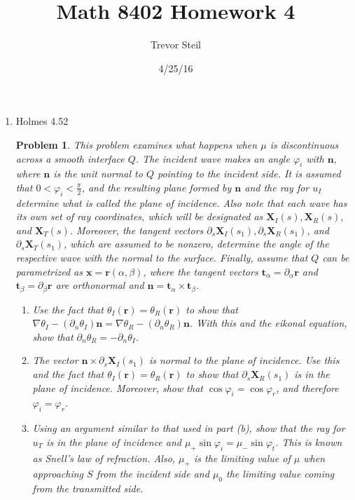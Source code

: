\documentclass[a4paper]{article}
\title{Math 8402 Homework 4 }
\date{4/25/16}
\author{Trevor Steil}
\newtheorem*{problem}{Problem}
\begin{document}
\maketitle
\begin{enumerate}
  \item Holmes 4.52
    \begin{problem}
      This problem examines what happens when $\mu$ is discontinuous across a smooth interface $Q$. The incident wave makes an angle $\varphi_i$ with
      $\mathbf{n}$, where $\mathbf{n}$ is the unit normal to $Q$ pointing to the incident side. It is assumed that $0 < \varphi_i <
      \frac{\pi}{2}$, and the resulting plane formed by $\mathbf{n}$ and the ray for $u_I$ determine what is called the plane of incidence. Also note
      that each wave has its own set of ray coordinates, which will be designated as $\mathbf{X}_I(s), \mathbf{X}_R(s),$ and $\mathbf{X}_T(s)$.
      Moreover, the tangent vectors $\partial_s \mathbf{X}_I(s_1), \partial_s \mathbf{X}_R(s_1)$, and $\partial_s \mathbf{X}_T(s_1)$, which are
      assumed to be nonzero, determine the angle of the respective wave with the normal to the surface. Finally, assume that $Q$ can be parametrized
      as $\mathbf{x} = \mathbf{r}(\alpha,\beta)$, where the tangent vectors $\mathbf{t}_\alpha = \partial_\alpha \mathbf{r}$ and $\mathbf{t}_\beta =
      \partial_\beta \mathbf{r}$ are orthonormal and $\mathbf{n} = \mathbf{t}_\alpha \times \mathbf{t}_\beta$.

      \begin{enumerate}
        \item Use the fact that $\theta_I(\mathbf{r}) = \theta_R(\mathbf{r})$ to show that $\nabla \theta_I - (\partial_n \theta_I) \mathbf{n} =
          \nabla \theta_R - (\partial_n \theta_R) \mathbf{n}$. With this and the eikonal equation, show that $\partial_n \theta_R = -\partial_n
          \theta_I$.

        \item The vector $\mathbf{n} \times \partial_s \mathbf{X}_I(s_1)$ is normal to the plane of incidence. Use this and the fact that
          $\theta_I(\mathbf{r}) = \theta_R(\mathbf{r})$ to show that $\partial_s \mathbf{X}_R(s_1)$ is in the plane of incidence. Moreover, show that
          $\cos \varphi_i = \cos \varphi_r$, and therefore $\varphi_i = \varphi_r$.

        \item Using an argument similar to that used in part (b), show that the ray for $u_T$ is in the plane of incidence and $\mu_+ \sin \varphi_i =
          \mu_- \sin \varphi_t$. This is known as Snell's law of refraction. Also, $\mu_+$ is the limiting value of $\mu$ when approaching $S$ from
          the incident side and $\mu_0$ the limiting value coming from the transmitted side.


\end{enumerate}
\end{problem}
\end{enumerate}
\end{document}
